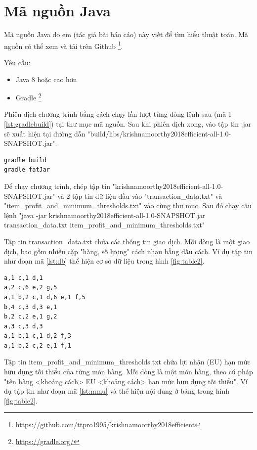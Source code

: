 

\section{Mã nguồn Java}

Mã nguồn Java do em (tác giả bài báo cáo) này viết để tìm hiểu thuật toán. Mã nguồn có thể xem và tải trên Github \footnote{\url{https://github.com/ttpro1995/krishnamoorthy2018efficient}}. 

Yêu cầu: 
\begin{itemize}
  \item Java 8 hoặc cao hơn 
  \item Gradle \footnote{\url{https://gradle.org/}}
\end{itemize}

Phiên dịch chương trình bằng cách chạy lần lượt từng dòng lệnh sau (mã 1 \ref{lst:gradlebuild}) tại thư mục mã nguồn. Sau khi phiên dịch xong, vào tập tin .jar sẽ xuất hiện tại đường dẫn  "build/libs/krishnamoorthy2018efficient-all-1.0-SNAPSHOT.jar". 

\begin{lstlisting}[caption={Câu lệnh phiên dịch chương trình}, label={lst:gradlebuild}, language=bash]
gradle build
gradle fatJar
\end{lstlisting}

Để chạy chương trình, chép tập tin "krishnamoorthy2018efficient-all-1.0-SNAPSHOT.jar" và 2 tập tin dữ liệu đầu vào "transaction\_data.txt" và "item\_profit\_and\_minimum\_thresholds.txt" vào cùng thư mục. Sau đó chạy câu lệnh "java -jar krishnamoorthy2018efficient-all-1.0-SNAPSHOT.jar transaction\_data.txt item\_profit\_and\_minimum\_thresholds.txt"

Tập tin transaction\_data.txt chứa các thông tin giao dịch. Mỗi dòng là một giao dịch, bao gồm nhiều cặp "hàng, số lượng" cách nhau bằng dấu cách. Ví dụ tập tin như đoạn mã \ref{lst:db} thể hiện cơ sở dữ liệu trong hình \ref{fig:table2}.

\begin{lstlisting}[caption={tập tin transaction\_data.txt}, label={lst:db}, language=bash]
a,1 c,1 d,1
a,2 c,6 e,2 g,5
a,1 b,2 c,1 d,6 e,1 f,5
b,4 c,3 d,3 e,1
b,2 c,2 e,1 g,2
a,3 c,3 d,3
a,1 b,1 c,1 d,2 f,3
a,1 b,2 c,2 e,1 f,1
\end{lstlisting}

Tập tin item\_profit\_and\_minimum\_thresholds.txt chứa lợi nhận (EU) hạn mức hữu dụng tối thiểu của từng món hàng. Mỗi dòng là một món hàng, theo cú pháp "tên hàng <khoảng cách> EU <khoảng cách> hạn mức hữu dụng tối thiểu". Ví dụ tập tin như đoạn mã \ref{lst:mmu} và thể hiện nội dung ở bảng trong hình \ref{fig:table2}.

